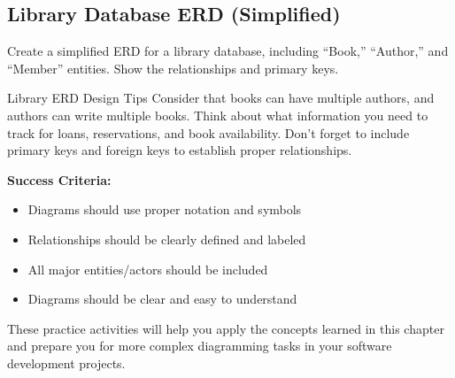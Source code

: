 \subsection{Library Database ERD (Simplified)}

Create a simplified ERD for a library database, including ``Book,'' ``Author,'' and ``Member'' entities. Show the relationships and primary keys.

\begin{examplecard}{Library ERD Design Tips}
  Consider that books can have multiple authors, and authors can write multiple books. Think about what information you need to track for loans, reservations, and book availability. Don't forget to include primary keys and foreign keys to establish proper relationships.
\end{examplecard}

\textbf{Success Criteria:}
\begin{itemize}
  \item Diagrams should use proper notation and symbols
  \item Relationships should be clearly defined and labeled
  \item All major entities/actors should be included
  \item Diagrams should be clear and easy to understand
\end{itemize}

These practice activities will help you apply the concepts learned in this chapter and prepare you for more complex diagramming tasks in your software development projects.